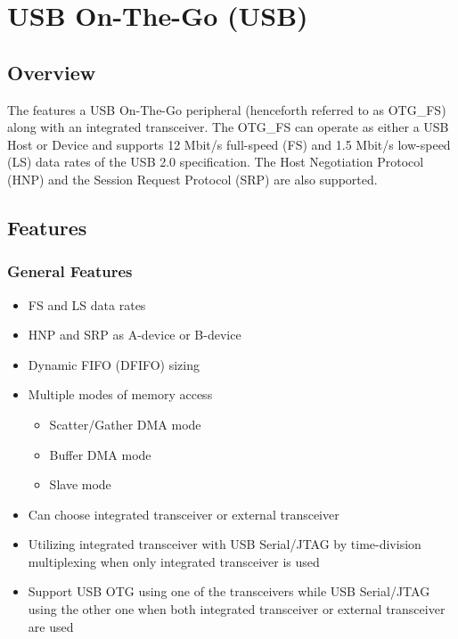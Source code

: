 \documentclass[main\_\_EN.tex]{subfiles}
\begin{document}

\ifglobal
\else
    {\let\clearpage\relax \listoftodos}
    \tableofcontents
\fi



\hypertarget{usbotg}{}
\chapter{USB On-The-Go (USB)}
\label{mod:usbotg}


\section{Overview}
The \chipname{} features a USB On-The-Go peripheral (henceforth referred to as OTG\_FS) along with an integrated transceiver. The OTG\_FS can operate as either a USB Host or Device and supports 12 Mbit/s full-speed (FS) and 1.5 Mbit/s low-speed (LS) data rates of the USB 2.0 specification. The Host Negotiation Protocol (HNP) and the Session Request Protocol (SRP) are also supported.

\section{Features}

\subsection{General Features}
\begin{itemize}
    \item FS and LS data rates
    \item HNP and SRP as A-device or B-device
    \item Dynamic FIFO (DFIFO) sizing
    \item Multiple modes of memory access
    \begin{itemize}
        \item Scatter/Gather DMA mode
        \item Buffer DMA mode
        \item Slave mode
    \end{itemize}
    \item Can choose integrated transceiver or external transceiver
    \item Utilizing integrated transceiver with USB Serial/JTAG by time-division multiplexing when only integrated transceiver is used
    \item Support USB OTG using one of the transceivers while USB Serial/JTAG using the other one when both integrated transceiver or external transceiver are used
\end{itemize}
\end{document}
